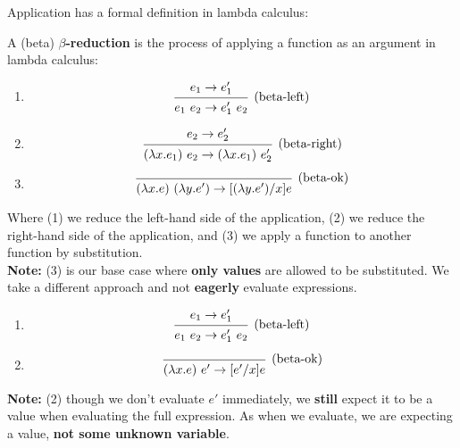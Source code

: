 \noindent
Application has a formal definition in lambda calculus:
\begin{Def}

    \label{def:beta-reduction}
    A (beta) \textbf{$\beta$-reduction} is the process of applying a function as an argument in lambda calculus:

    \begin{enumerate}
        \item \[
        \begin{prooftree}
        \hypo{e_1 \rightarrow e_1'}
        \Infer1[(\text{beta-left})]{e_1\ e_2 \rightarrow e_1'\ e_2}
        \end{prooftree}
        \]
        \item \[
        \begin{prooftree}
        \hypo{e_2 \rightarrow e_2'}
        \Infer1[(\text{beta-right})]{(\lambda x . e_1)\ e_2 \rightarrow (\lambda x . e_1)\ e_2'}
        \end{prooftree}
        \]
        \item  \[
        \begin{prooftree}
        \Infer0[(\text{beta-ok})]{(\lambda x. e)\ (\lambda y. e') \rightarrow [(\lambda y. e')/x]e}
        \end{prooftree}
        \]
    \end{enumerate}

    \noindent
    Where (1) we reduce the left-hand side of the application, (2) we reduce the right-hand side of the application, and (3) we apply a function to another function by substitution.\\

    \noindent
    \textbf{Note:} (3) is our base case where \textbf{only values} are allowed to be substituted.
    We take a different approach and not \textbf{eagerly} evaluate expressions.

    \begin{enumerate}
        \item \[
        \begin{prooftree}
        \hypo{e_1 \rightarrow e_1'}
        \Infer1[(\text{beta-left})]{e_1\ e_2 \rightarrow e_1'\ e_2}
        \end{prooftree}
        \]
        \item \[
        \begin{prooftree}
           \Infer0[(\text{beta-ok})]{(\lambda x. e)\ e' \rightarrow [e'/x]e}
        \end{prooftree}
        \]
    \end{enumerate}

    \noindent
    \textbf{Note:} (2) though we don't evaluate $e'$ immediately, we \textbf{still} expect it to be a value when evaluating the full expression.
    As when we evaluate, we are expecting a value, \textbf{not some unknown variable}.

\end{Def}

